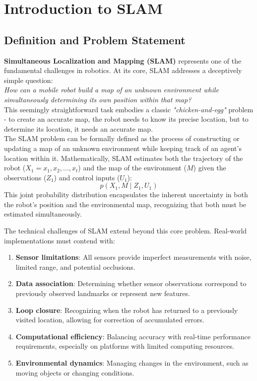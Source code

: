 \documentclass[12pt]{article}
\begin{document}
    \newpage

    \tableofcontents

    \newpage
    \clearpage             %
    \setcounter{page}{1}   %
    \section{Introduction to SLAM}
    \subsection{Definition and Problem Statement}
    \textbf{Simultaneous Localization and Mapping (SLAM)} represents one of the fundamental challenges in robotics. At its core, SLAM addresses a deceptively simple question: 
    \\ \textit{How can a mobile robot build a map of an unknown environment while simultaneously determining its own position within that map?} 
    \\ This seemingly straightforward task embodies a classic \textit{"chicken-and-egg"} problem - to create an accurate map, the robot needs to know its precise location,
    but to determine its location, it needs an accurate map.
    \\ The SLAM problem can be formally defined as the process of constructing or updating a map of an unknown environment while keeping track of an agent's location within it. 
    Mathematically, SLAM estimates both the trajectory of the robot ($X_{1} = {x_1, x_2, \ldots, x_t}$) and the map of the environment ($M$) given the observations ($Z_{1}$) and control inputs ($U_{1}$):
    \[p(X_{1}, M \mid Z_{1}, U_{1})\]
    This joint probability distribution encapsulates the inherent uncertainty in both the robot's position and the environmental map, recognizing that both must be estimated simultaneously.

    \newpage

    The technical challenges of SLAM extend beyond this core problem. Real-world implementations must contend with:
    \begin{enumerate}
        \item \textbf{Sensor limitations}: All sensors provide imperfect measurements with noise, limited range, and potential occlusions.
        \item \textbf{Data association}: Determining whether sensor observations correspond to previously observed landmarks or represent new features.
        \item \textbf{Loop closure}: Recognizing when the robot has returned to a previously visited location, allowing for correction of accumulated errors.
        \item \textbf{Computational efficiency}: Balancing accuracy with real-time performance requirements, especially on platforms with limited computing resources.
        \item \textbf{Environmental dynamics}: Managing changes in the environment, such as moving objects or changing conditions.
    \end{enumerate}
\end{document}
